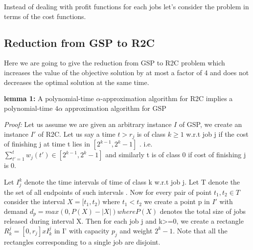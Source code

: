 \documentclass[11pt, a4paper, notitlepage, oneside]{article}
\begin{document}
{Instead of dealing with profit functions for each jobs let's consider the problem in terms of the cost functions. 

\subsection{Reduction from GSP to R2C}
Here we are going to give the reduction from GSP to R2C problem which increases the value of the objective solution by at most a factor of 4 and does not decreases the optimal solution at the same time.

\textbf{lemma 1: } A polynomial-time $\alpha$-approximation algorithm for R2C implies a polynomial-time $4\alpha$ approximation algorithm for GSP 

\textit{Proof:} Let us assume we are given an arbitrary instance $ I $ of GSP, we create an instance $I'$ of R2C. Let us say a time $ t > r_j $ is of class $ k \geq 1 $ w.r.t job j if the cost of finishing j at time t lies in $ [2^{k-1},2^k-1] $ . i.e. $ \sum_{t'=1}^t w_j(t')  \in [ 2^{k-1},2^k-1 ] $ and similarly t is of class 0 if cost of finishing j is 0. 

Let $I_j^k$ denote the time intervals of time of class k w.r.t job j. Let T denote the the set of all endpoints of such intervals . Now for every pair of point $t_1,t_2 \in T $ consider the interval $ X= [t_1,t_2) $ where $t_1<t_2$ we create a point p in $ I' $ with demand $d_p=max(0, P(X)-|X| ) where P(X)$ denotes the total size of jobs released during interval X. Then for each job j and k>=0, we create a rectangle $ R_k^j = [0,r_j] x I_k^j  $ in I' with capacity $p_j$ and weight $2^k - 1 $. Note that all the rectangles corresponding to a single job are disjoint.


\begin{figure}
    \centerline{%
    }
\end{figure}

}
\end{document}
